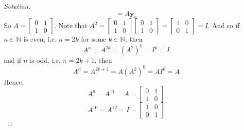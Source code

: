 \documentclass{article}
\newcommand{\N}{{\mathbb N}}
\begin{document}
\begin{enumerate}
\begin{proof}[Solution]
\[			= A\mathbf{y}_n
		\]
		So $A = \begin{bmatrix} 0 & 1 \\ 1 & 0 \end{bmatrix}$.
		Note that $A^2 =
		\begin{bmatrix} 0 & 1 \\ 1 & 0 \end{bmatrix}\begin{bmatrix} 0 & 1 \\ 1 & 0 \end{bmatrix}
		= \begin{bmatrix} 1 & 0 \\ 0 & 1 \end{bmatrix} = I$.
		And so if $n\in\N$ is even, i.e. $n = 2k$ for some $k \in \N$, then
		\[
			A^n = A^{2k} = (A^2)^k = I^k = I
		\]
		and if $n$ is odd, i.e. $n = 2k+1$, then
		\[
			A^n = A^{2k+1} = A(A^2)^k = AI^k = A
		\]
		Hence,
		\[
			A^9 = A^{11} = A = \begin{bmatrix} 0 & 1 \\ 1 & 0 \end{bmatrix}
		\]
		\[
			A^{10} = A^{12} = I = \begin{bmatrix} 1 & 0 \\ 0 & 1 \end{bmatrix}
		\]
	\end{proof}
\end{enumerate}
\end{document}
